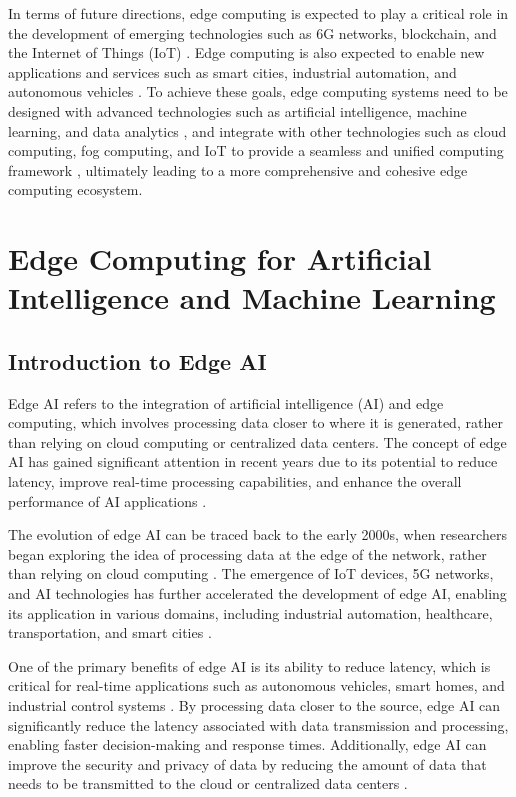\documentclass[11pt]{article}
\begin{document}
In terms of future directions, edge computing is expected to play a critical role in the development of emerging technologies such as 6G networks, blockchain, and the Internet of Things (IoT) \cite{ref41}. Edge computing is also expected to enable new applications and services such as smart cities, industrial automation, and autonomous vehicles \cite{ref83}. To achieve these goals, edge computing systems need to be designed with advanced technologies such as artificial intelligence, machine learning, and data analytics \cite{ref58}, and integrate with other technologies such as cloud computing, fog computing, and IoT to provide a seamless and unified computing framework \cite{ref84}, ultimately leading to a more comprehensive and cohesive edge computing ecosystem.

\section{Edge Computing for Artificial Intelligence and Machine Learning}

\subsection{Introduction to Edge AI}

Edge AI refers to the integration of artificial intelligence (AI) and edge computing, which involves processing data closer to where it is generated, rather than relying on cloud computing or centralized data centers. The concept of edge AI has gained significant attention in recent years due to its potential to reduce latency, improve real-time processing capabilities, and enhance the overall performance of AI applications \cite{ref85}.

The evolution of edge AI can be traced back to the early 2000s, when researchers began exploring the idea of processing data at the edge of the network, rather than relying on cloud computing \cite{ref12}. The emergence of IoT devices, 5G networks, and AI technologies has further accelerated the development of edge AI, enabling its application in various domains, including industrial automation, healthcare, transportation, and smart cities \cite{ref86}.

One of the primary benefits of edge AI is its ability to reduce latency, which is critical for real-time applications such as autonomous vehicles, smart homes, and industrial control systems \cite{ref87}. By processing data closer to the source, edge AI can significantly reduce the latency associated with data transmission and processing, enabling faster decision-making and response times. Additionally, edge AI can improve the security and privacy of data by reducing the amount of data that needs to be transmitted to the cloud or centralized data centers \cite{ref88}.
\end{document}
